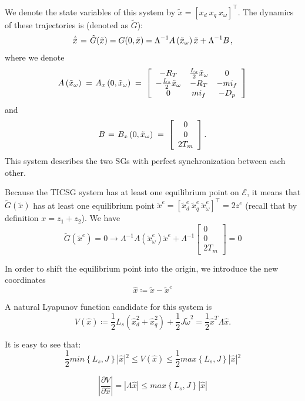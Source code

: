 \documentclass[letterpaper, 10 pt, conference]{ieeeconf}
\renewcommand{\o}    {{\omega}}
\newcommand{\m}      {{\hbox{\hskip 1pt}}}
\newcommand{\Emscr}  {{\mathcal{E}}}
\begin{document}
We denote the state variables of this system by $\tilde{x}=
\left[x_d\ x_q\ x_\o\right]^\top$. The dynamics of these trajectories
is (denoted as $\tilde{G}$):
$$ \dot{\tilde{x}} \m=\m \tilde{G}(\tilde{x}) = G(0,\tilde{x}) =
   \Lambda^{-1} A\left( \tilde{x}_\omega \right) \tilde{x}+
   \Lambda^{-1} B \m,$$
where we denote
$$ A\left( \tilde{x}_\o \right) \m=\m A_x\left(0, \tilde{x}_\o
   \right) \m=\m \left[\begin{array}{ccc} - R_T & \frac{L_s}{2}
   \tilde{x}_\o & 0\\ -\frac{L_{s}}{2}\tilde{x}_\o & -R_T & -mi_f\\
   0 & mi_{f} & -D_{p} \end{array}\right]$$
and
$$ B \m=\m B_x\left(0, \tilde{x}_\o \right) \m=\m \left[\begin{array}
   {c} 0\\ 0\\ 2T_m \end{array}\right].$$
This system describes the two SGs with perfect synchronization between
each other.

Because the TICSG system has at least one equilibrium point on
$\Emscr$, it means that $\tilde{G}(\tilde{x})$ has at least one
equilibrium point $\tilde{x}^{e}=\left[\tilde{x}_{d}^{e}\
\tilde{x}_{q}^{e}\ \tilde{x}_{\omega}^{e} \right]^\top = 2z^e$ (recall
that by definition $x = z_1 + z_2$). We have
\begin{equation}
\tilde{G}(\tilde{x}^{e})=0\rightarrow\varLambda^{-1}A(\tilde{x}_{\omega}^{e})\tilde{x}^{e}+\varLambda^{-1}\left[\begin{array}{c}
0\\
0\\
2T_{m}
\end{array}\right]=0\label{eq:G_at_equilibrium}
\end{equation}

In order to shift the equilibrium point into the origin, we introduce the new  coordinates
$$
\hat{x}\coloneqq\tilde{x}-\tilde{x}^{e}
$$

A natural Lyapunov function candidate for this system is 
$$
V(\hat{x})\coloneqq\frac{1}{2}L_{s}\left(\hat{x}_{d}^{2}+\hat{x}_{q}^{2}\right)+\frac{1}{2}J\tilde{\omega}^{2}=\frac{1}{2}\hat{x}^{T}\varLambda\hat{x}.
$$

It is easy to see that:
$$
\frac{1}{2} min\left\{L_{s},J\right\}|\hat{x}|{}^{2}\leq V(\hat{x})\leq \frac{1}{2} max\left\{L_{s},J\right\}|\hat{x}|{}^{2}
$$

$$
\left|\frac{\partial V}{\partial\hat{x}}\right|=\left|\varLambda\hat{x}\right|\leq max\left\{L_{s},J\right\}\left|\hat{x}\right|
$$
\end{document}
